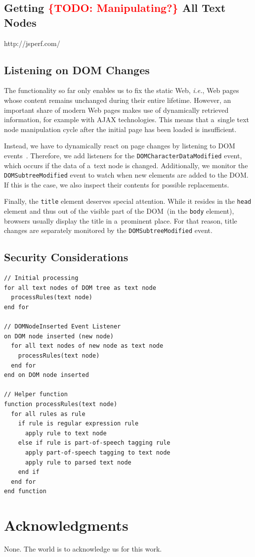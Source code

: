 \documentclass{acm_proc_article-sp}
\let\oldemph\emph
\renewcommand{\emph}[1]{\oldemph{\fontsize{9}{9}\selectfont #1}}
\newcommand{\todo}[1]{\noindent\textcolor{red}{{\bf \{TODO}: #1{\bf \}}}}
\newcommand{\inlinelistingsize}{\fontsize{8pt}{11pt}}
\let\oldttdefault\ttdefault
\renewcommand{\ttdefault}{pcr}
\let\oldurl\url
\renewcommand{\url}[1]{\inlinelistingsize\oldurl{#1}}
\begin{document}
\subsection{Getting \todo{Manipulating?} All Text Nodes}
\label{subsec:textnodes}
http://jsperf.com/

\subsection{Listening on DOM Changes}
The functionality so far only enables us to fix the static Web, \emph{i.e.}, Web pages whose content remains unchanged during their entire lifetime.
However, an important share of modern Web pages makes use of dynamically retrieved information, for example with AJAX technologies.
This means that a~single text node manipulation cycle after the initial page has been loaded is insufficient.

Instead, we have to dynamically react on page changes by listening to DOM events~\cite{w3cevents2011}.
Therefore, we add listeners for the \Verb!DOMCharacterDataModified! event, which occurs if the data of a~text node is changed.
Additionally, we monitor the \Verb!DOMSubtreeModified! event to watch when new elements are added to the DOM.
If this is the case, we also inspect their contents for possible replacements.

Finally, the \Verb!title! element deserves special attention.
While it resides in the \Verb!head! element and thus out of the visible part of the DOM~(in the \Verb!body! element),
browsers usually display the title in a~prominent place.
For that reason, title changes are separately monitored by the \Verb!DOMSubtreeModified! event.

\subsection{Security Considerations}

\begin{lstlisting}[caption=Pseudocode illustrating the browser extension's functionality., label=code:xkcd, float=h, escapechar=§, belowskip=-1em]
// Initial processing
for all text nodes of DOM tree as text node
  processRules(text node)
end for  

// DOMNodeInserted Event Listener
on DOM node inserted (new node)
  for all text nodes of new node as text node
    processRules(text node)
  end for  
end on DOM node inserted

// Helper function
function processRules(text node)
  for all rules as rule
    if rule is regular expression rule
      apply rule to text node
    else if rule is part-of-speech tagging rule
      apply part-of-speech tagging to text node
      apply rule to parsed text node
    end if
  end for
end function  
\end{lstlisting} 

\section{Acknowledgments}
None. The world is to acknowledge us for this work.

\let\ttdefault\oldttdefault
\let\url\oldurl




\balancecolumns
\end{document}
